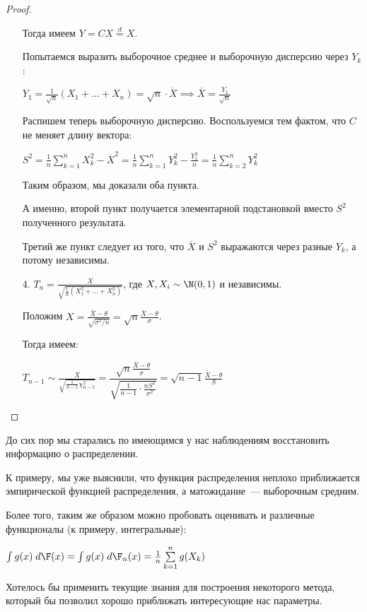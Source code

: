 \begin{nmlemma}[Фишера]
\begin{proof}
\begin{enumerate}
			Тогда имеем $Y = CX \overset{d}{=} X$.
			
			Попытаемся выразить выборочное среднее и выборочную дисперсию через $Y_k$:
			
			$Y_1 = \frac{1}{\sqrt{n}}(X_1 + \ldots + X_n) = \sqrt{n} \cdot \overline{X} \implies \overline{X} = \frac{Y_1}{\sqrt{n}}$
			
			Распишем теперь выборочную дисперсию. Воспользуемся тем фактом, что $C$ не меняет длину вектора:
			
			$S^2 = \frac{1}{n} \sum\limits_{k=1}^{n} X_k^2 - \overline{X}^2 = \frac{1}{n} \sum\limits_{k=1}^{n} Y_k^2 - \frac{Y_1^2}{n} = \frac1n \sum\limits_{k=2}^{n} Y_k^2$
			
			Таким образом, мы доказали оба пункта.
			
			А именно, второй пункт получается элементарной подстановкой вместо $S^2$ полученного результата.
			
			Третий же пункт следует из того, что $\overline{X}$ и $S^2$ выражаются через разные $Y_k$, а потому независимы.
			
			\item[4.]
			$T_n = \frac{X}{\sqrt{\frac1n (X_1^2 + \ldots + X_n^2)}}$, где $X, X_i \sim \N(0, 1)$ и независимы.
				
			Положим $X = \frac{\overline{X} - \theta}{\sqrt{\sigma^2 / n}} = \sqrt{n} \frac{\overline{X} - \theta}{\sigma}$.
				
			Тогда имеем:
			
			$T_{n-1} \sim \frac{X}{\sqrt{\frac{1}{n-1} \chi_{n-1}^2}} = \dfrac{\sqrt{n} \frac{\overline{X} - \theta}{\sigma}}{\sqrt{\frac{1}{n-1} \cdot \frac{n S^2}{\sigma^2}}} = \sqrt{n-1} \frac{\overline{X} - \theta}{S}$
		\end{enumerate}
	\end{proof}
\end{nmlemma}


\begin{motivation}
	\slashns
	
	До сих пор мы старались по имеющимся у нас наблюдениям восстановить информацию о распределении.
	
	К примеру, мы уже выяснили, что функция распределения неплохо приближается эмпирической функцией распределения, а матожидание~--- выборочным средним.
	
	Более того, таким же образом можно пробовать оценивать и различные функционалы (к примеру, интегральные):
	
	$\int g(x) \; d \F(x) = \int g(x) \; d \F_n(x) = \frac{1}{n} \sum\limits_{k=1}^{n} g(X_k)$
	
	Хотелось бы применить текущие знания для построения некоторого метода, который бы позволил хорошо приближать интересующие нас параметры.
\end{motivation}

